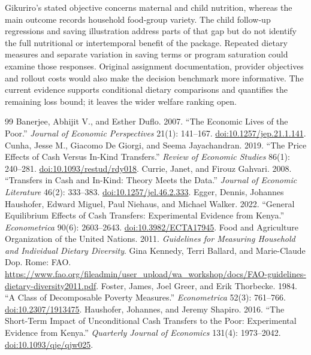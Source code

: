 \documentclass[11pt]{article}
\begin{document}
Gikuriro's stated objective concerns maternal and child nutrition, whereas the main outcome records household food-group variety. The child follow-up regressions and saving illustration address parts of that gap but do not identify the full nutritional or intertemporal benefit of the package. Repeated dietary measures and separate variation in saving terms or program saturation could examine those responses. Original assignment documentation, provider objectives and rollout costs would also make the decision benchmark more informative. The current evidence supports conditional dietary comparisons and quantifies the remaining loss bound; it leaves the wider welfare ranking open.
\clearpage
\begin{singlespace}\footnotesize
\begin{thebibliography}{99}
 Banerjee, Abhijit V., and Esther Duflo. 2007. ``The Economic Lives of the Poor.'' \emph{Journal of Economic Perspectives} 21(1): 141--167. \href{https://doi.org/10.1257/jep.21.1.141}{doi:10.1257/jep.21.1.141}.
 Cunha, Jesse M., Giacomo De Giorgi, and Seema Jayachandran. 2019. ``The Price Effects of Cash Versus In-Kind Transfers.'' \emph{Review of Economic Studies} 86(1): 240--281. \href{https://doi.org/10.1093/restud/rdy018}{doi:10.1093/restud/rdy018}.
 Currie, Janet, and Firouz Gahvari. 2008. ``Transfers in Cash and In-Kind: Theory Meets the Data.'' \emph{Journal of Economic Literature} 46(2): 333--383. \href{https://doi.org/10.1257/jel.46.2.333}{doi:10.1257/jel.46.2.333}.
 Egger, Dennis, Johannes Haushofer, Edward Miguel, Paul Niehaus, and Michael Walker. 2022. ``General Equilibrium Effects of Cash Transfers: Experimental Evidence from Kenya.'' \emph{Econometrica} 90(6): 2603--2643. \href{https://doi.org/10.3982/ECTA17945}{doi:10.3982/ECTA17945}.
 Food and Agriculture Organization of the United Nations. 2011. \emph{Guidelines for Measuring Household and Individual Dietary Diversity}. Gina Kennedy, Terri Ballard, and Marie-Claude Dop. Rome: FAO. \url{https://www.fao.org/fileadmin/user_upload/wa_workshop/docs/FAO-guidelines-dietary-diversity2011.pdf}.
 Foster, James, Joel Greer, and Erik Thorbecke. 1984. ``A Class of Decomposable Poverty Measures.'' \emph{Econometrica} 52(3): 761--766. \href{https://doi.org/10.2307/1913475}{doi:10.2307/1913475}.
 Haushofer, Johannes, and Jeremy Shapiro. 2016. ``The Short-Term Impact of Unconditional Cash Transfers to the Poor: Experimental Evidence from Kenya.'' \emph{Quarterly Journal of Economics} 131(4): 1973--2042. \href{https://doi.org/10.1093/qje/qjw025}{doi:10.1093/qje/qjw025}.

\end{thebibliography}
\end{singlespace}
\end{document}
